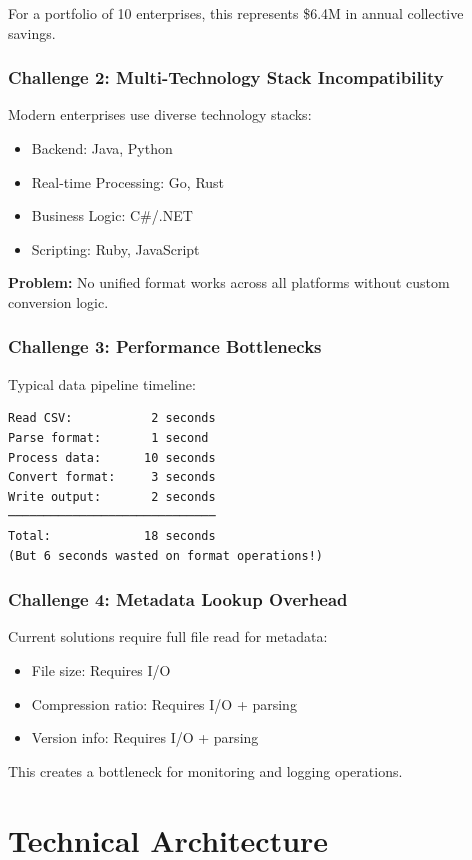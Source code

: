 \documentclass[12pt,a4paper]{report}
\begin{document}
For a portfolio of 10 enterprises, this represents \$6.4M in annual collective savings.

\subsection{Challenge 2: Multi-Technology Stack Incompatibility}

Modern enterprises use diverse technology stacks:
\begin{itemize}
    \item Backend: Java, Python
    \item Real-time Processing: Go, Rust
    \item Business Logic: C\#/.NET
    \item Scripting: Ruby, JavaScript
\end{itemize}

\textbf{Problem:} No unified format works across all platforms without custom conversion logic.

\subsection{Challenge 3: Performance Bottlenecks}

Typical data pipeline timeline:
\begin{verbatim}
Read CSV:           2 seconds
Parse format:       1 second
Process data:      10 seconds
Convert format:     3 seconds
Write output:       2 seconds
─────────────────────────────
Total:             18 seconds
(But 6 seconds wasted on format operations!)
\end{verbatim}

\subsection{Challenge 4: Metadata Lookup Overhead}

Current solutions require full file read for metadata:
\begin{itemize}
    \item File size: Requires I/O
    \item Compression ratio: Requires I/O + parsing
    \item Version info: Requires I/O + parsing
\end{itemize}

This creates a bottleneck for monitoring and logging operations.

\chapter{Technical Architecture}
\end{document}
